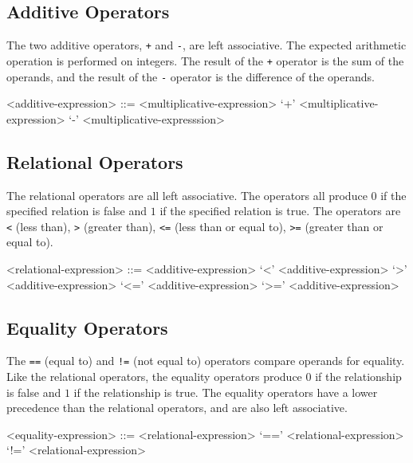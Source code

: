 \documentclass[letterpaper]{article}
\begin{document}
\subsection{Additive Operators}
The two additive operators, \texttt{+} and \texttt{-}, are left associative.  The expected arithmetic operation is performed on integers.  The result of the \texttt{+} operator is the sum of the operands, and the result of the \texttt{-} operator is the difference of the operands.
\begin{grammar}
<additive-expression> ::= <multiplicative-expression>
 `+' <multiplicative-expression>
 `-' <multiplicative-expresssion>
\end{grammar}


\subsection{Relational Operators}
The relational operators are all left associative.  The operators all produce $0$ if the specified relation is false and $1$ if the specified relation is true.  The operators are \texttt{<} (less than), \texttt{>} (greater than), \texttt{<=} (less than or equal to), \texttt{>=} (greater than or equal to).
\begin{grammar}
<relational-expression> ::= <additive-expression>
 `<' <additive-expression>
 `>' <additive-expression>
 `<=' <additive-expression>
 `>=' <additive-expression>
\end{grammar}

\subsection{Equality Operators}
The \texttt{==} (equal to) and \texttt{!=} (not equal to) operators compare operands for equality.  Like the relational operators, the equality operators produce $0$ if the relationship is false and $1$ if the relationship is true.  The equality operators have a lower precedence than the relational operators, and are also left associative.
\begin{grammar}
<equality-expression> ::= <relational-expression>
 `==' <relational-expression>
 `!=' <relational-expression>
\end{grammar}
\end{document}
